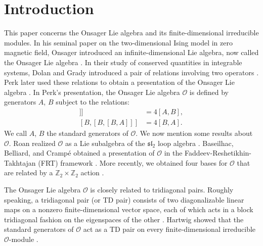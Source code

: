 \documentclass[11pt]{article}%
\theoremstyle{definition}
\theoremstyle{plain}
\begin{document}
\section{Introduction}
This paper concerns the Onsager Lie algebra and its finite-dimensional irreducible modules.
In his seminal paper on the two-dimensional Ising model in zero magnetic field, Onsager introduced an infinite-dimensional Lie algebra, now called the Onsager Lie algebra \cite{1944Ons}.
In their study of conserved quantities in integrable systems, Dolan and Grady introduced a pair of relations involving two operators \cite{1982DG}.
Perk later used these relations to obtain a presentation of the Onsager Lie algebra \cite{1989Perk}.
In Perk's presentation, the Onsager Lie algebra $\mathcal{O}$ is defined by generators $A$, $B$ subject to the relations:
\begin{align*}
	[A,[A,[A,B]]] & = 4[A,B], \\
	[B,[B,[B,A]]] & = 4[B,A].
\end{align*}
We call $A$, $B$ the standard generators of $\mathcal{O}$.
We now mention some results about $\mathcal{O}$.
Roan realized $\mathcal{O}$ as a Lie subalgebra of the $\mathfrak{sl}_2$ loop algebra \cite{1991Roan}.
Baseilhac, Belliard, and Cramp\'e obtained a presentation of $\mathcal{O}$ in the Faddeev-Reshetikhin-Takhtajan (FRT) framework \cite{2018BBC}.
More recently, we obtained four bases for $\mathcal{O}$ that are related by a $\mathbb{Z}_2\times\mathbb{Z}_2$ action \cite{2026LeeJOAC}.

\smallskip
The Onsager Lie algebra $\mathcal{O}$ is closely related to tridiagonal pairs.
Roughly speaking, a tridiagonal pair (or TD pair) consists of two diagonalizable linear maps on a nonzero finite-dimensional vector space, each of which acts in a block tridiagonal fashion on the eigenspaces of the other \cite{ITT2001}.
Hartwig showed that the standard generators of $\mathcal{O}$ act as a TD pair on every finite-dimensional irreducible $\mathcal{O}$-module \cite{2007Har}.
\end{document}
